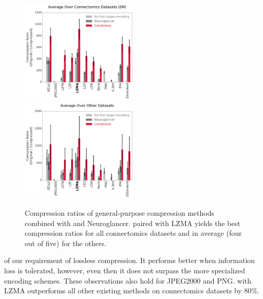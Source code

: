 
\begin{figure}[h]
	\begin{center}
		\includegraphics[width=0.5\textwidth]{gfx/LCylinder+ac3+ac4+cremiA+cremiB+cremiC_rhoana_compression_ratios.pdf}%
		\includegraphics[width=0.5\textwidth]{gfx/VOC+mri1+mri2+mri3+BSD_gold_compression_ratios.pdf}%
		\caption{Compression ratios of general-purpose compression methods combined with \appName and Neuroglancer. %
		\appName paired with LZMA yields the best compression ratios for all connectomics datasets and in average (four out of five) for the others.}
		\label{fig:compression_ratios}
	\end{center}
	\vspace{-18pt}
\end{figure}





\noindent of our requirement of lossless compression. It performs better when information loss is tolerated, however, even then it does not surpass the more specialized encoding schemes. These observations also hold for JPEG2000 and PNG. \appName with LZMA outperforms all other existing methods on connectomics datasets by 80\%. 

